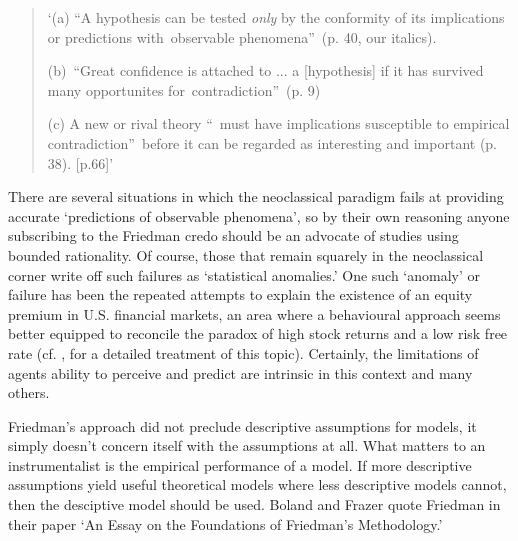 \documentclass{ucthesis}
\begin{document}
\begin{quote}
`(a) \textquotedblleft A hypothesis can be tested \textit{only} by the
conformity of its implications or predictions with\ observable
phenomena\textquotedblright\ (p. 40, our italics).

(b)\ \textquotedblleft Great confidence is attached to ... a [hypothesis] if
it has survived many opportunites for\ contradiction\textquotedblright\ (p.
9)

(c) A new or rival theory \textquotedblleft\ must have implications
susceptible to empirical contradiction\textquotedblright\ before it can be
regarded as interesting and important (p. 38). [p.66]' \cite[pp. 315]{wong
1973}
\end{quote}

There are several situations in which the neoclassical paradigm fails at
providing accurate `predictions of observable phenomena', so by their own
reasoning anyone subscribing to the Friedman credo should be an advocate of
studies using bounded rationality. Of course, those that remain squarely in
the neoclassical corner write off such failures as `statistical anomalies.'
One such `anomaly' or failure has been the repeated attempts to explain the
existence of an equity premium in U.S. financial markets, an area where a
behavioural approach seems better equipped to reconcile the paradox of high
stock returns and a low risk free rate (cf. \cite{myopic}, for a detailed
treatment of this topic). Certainly, the limitations of agents ability to
perceive and predict are intrinsic in this context and many others.

Friedman's approach did not preclude descriptive assumptions for models, it
simply doesn't concern itself with the assumptions at all. What matters to
an instrumentalist is the empirical performance of a model. If more
descriptive assumptions yield useful theoretical models where less
descriptive models cannot, then the desciptive model should be used. Boland
and Frazer \cite[1983]{boland 1983} quote Friedman in their paper `An Essay
on the Foundations of Friedman's Methodology.'
\end{document}
